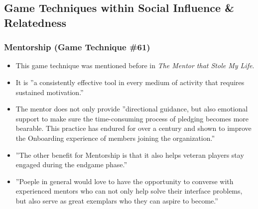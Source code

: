 \subsection{Game Techniques within Social Influence \& Relatedness}
\subsubsection{Mentorship (Game Technique \#61)}
    \begin{itemize}
        \item This game technique was mentioned before in \textit{The Mentor that Stole My Life}.
        \item It is ''a consistently effective tool in every medium of activity that requires sustained motivation.''
        \item The mentor does not only provide ''directional guidance, but also emotional support to make sure the time-consuming process of pledging becomes more bearable. This practice has endured for over a century and shown to improve the Onboarding experience of members joining the organization.''
        \item ''The other benefit for Mentorship is that it also helps veteran players stay engaged during the endgame phase.''
        \item ''Poeple in general would love to have the opportunity to converse with experienced mentors who can not only help solve their interface problems, but also serve as great exemplars who they can aspire to become.''
    \end{itemize}
    
